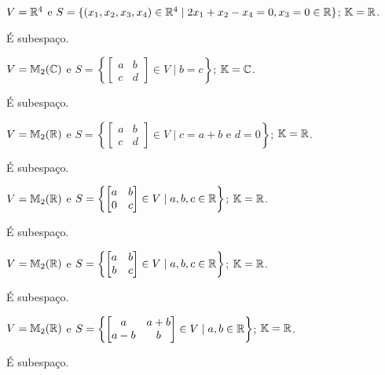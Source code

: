 \documentclass[12pt]{exam}
\begin{document}
\begin{exercicio}
	$V = \mathbb{R}^4$ e $S = \{(x_1, x_2, x_3, x_4) \in \mathbb{R}^4 \mid 2x_1 + x_2 - x_4 = 0, x_3 = 0 \in \mathbb{R}\}$; $\mathbb{K} = \mathbb{R}$.
	\begin{solucao}
		\'E subespa\c{c}o.
	\end{solucao}
\end{exercicio}

\begin{exercicio}
	$V = \mathbb{M}_2(\mathbb{C})$ e $S = \left\{\begin{bmatrix} a & b\\ c & d\end{bmatrix} \in V \mid b = c\right\}$; $\mathbb{K} = \mathbb{C}$.
	\begin{solucao}
		\'E subespa\c{c}o.
	\end{solucao}
\end{exercicio}

\begin{exercicio}
	$V = \mathbb{M}_2(\mathbb{R})$ e $S = \left\{\begin{bmatrix} a & b\\ c & d\end{bmatrix} \in V \mid c = a + b \mbox{ e } d = 0\right\}$; $\mathbb{K} = \mathbb{R}$.
	\begin{solucao}
		\'E subespa\c{c}o.
	\end{solucao}
\end{exercicio}

\begin{exercicio}
	$V = \mathbb{M}_2(\mathbb{R})$ e $S = \left\{\begin{bmatrix} a & b\\ 0 & c\end{bmatrix} \in V \mid a, b, c \in \mathbb{R}\right\}$; $\mathbb{K} = \mathbb{R}$.
	\begin{solucao}
		\'E subespa\c{c}o.
	\end{solucao}
\end{exercicio}

\begin{exercicio}
	$V = \mathbb{M}_2(\mathbb{R})$ e $S = \left\{\begin{bmatrix} a & b\\ b & c\end{bmatrix} \in V \mid a, b, c \in \mathbb{R}\right\}$; $\mathbb{K} = \mathbb{R}$.
	\begin{solucao}
		\'E subespa\c{c}o.
	\end{solucao}
\end{exercicio}

\begin{exercicio}\label{subespacofim}
	$V = \mathbb{M}_2(\mathbb{R})$ e $S = \left\{\begin{bmatrix} a & a+b\\ a-b & b\end{bmatrix} \in V \mid a, b \in \mathbb{R} \right\}$; $\mathbb{K} = \mathbb{R}$.
	\begin{solucao}
		\'E subespa\c{c}o.
	\end{solucao}
\end{exercicio}
\end{document}
